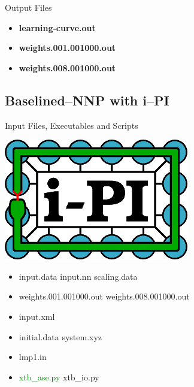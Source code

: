\documentclass[12pt]{article}
\begin{document}
\begin{mybox3}{Output Files}
\begin{itemize}
    \item \textbf{learning-curve.out}
    \item \textbf{weights.001.001000.out}
    \item \textbf{weights.008.001000.out}
\end{itemize}
\end{mybox3}
%
\subsection{Baselined--NNP with i--PI}
\begin{mybox2}{{Input Files, Executables and Scripts}}
\begin{minipage}[c]{0.5\linewidth}
\includegraphics[scale=0.35]{latex_files/ipi-logo-alpha.png}
\end{minipage}
\begin{minipage}[c]{0.5\linewidth}
\begin{itemize}
    \item input.data input.nn scaling.data
    \item weights.001.001000.out weights.008.001000.out
    \item input.xml
    \item initial.data system.xyz
    \item lmp1.in
    \item \textcolor{green}{xtb\_ase.py} xtb\_io.py
\end{itemize}
\end{minipage}
\end{mybox2}
\end{document}
